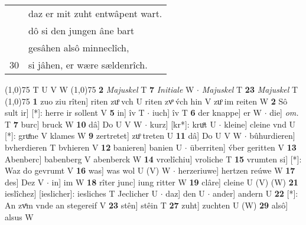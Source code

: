 \documentclass[8pt,a4paper,notitlepage]{article}
\begin{document}
\begin{table}[ht]
\begin{minipage}[t]{0.5\linewidth}
\begin{tabular}{rl}
 & daz er mit zuht entwâpent wart.\\ 
 & dô si den jungen âne bart\\ 
 & gesâhen alsô minneclîch,\\ 
30 & si jâhen, er wære sældenrîch.\\ 
\end{tabular}
\scriptsize
\line(1,0){75} \newline
T U V W \newline
\line(1,0){75} \newline
\textbf{2} \textit{Majuskel} T  \textbf{7} \textit{Initiale} W   $\cdot$ \textit{Majuskel} T  \textbf{23} \textit{Majuskel} T  \newline
\line(1,0){75} \newline
\textbf{1} zuo ziu rîten] riten zuͦ vch U riten zvͦ v́ch hin V zuͦ im reiten W \textbf{2} Sô sult ir] [*]: herre ir sollent V \textbf{5} in] îv T  $\cdot$ iuch] îv T \textbf{6} der knappe] er W  $\cdot$ die] \textit{om.} T \textbf{7} burc] bruck W \textbf{10} dâ] Do U V W  $\cdot$ kurz] [kr*]: kruͦt U  $\cdot$ kleine] cleine vnd U [*]: gruͤne V klames W \textbf{9} zertretet] zuͦ treten U \textbf{11} dâ] Do U V W  $\cdot$ bûhurdieren] bvherdieren T bvhieren V \textbf{12} banieren] banien U  $\cdot$ überriten] v́ber geritten V \textbf{13} Abenberc] babenberg V abenberck W \textbf{14} vrœlîchiu] vroliche T \textbf{15} vrumten si] [*]: Waz do gevrumt V \textbf{16} was] was wol U (V) W  $\cdot$ herzeriuwe] hertzen reúwe W \textbf{17} des] Dez V  $\cdot$ in] im W \textbf{18} rîter junc] iung ritter W \textbf{19} clâre] cleine U (V) (W) \textbf{21} ieslîchez] [ieslicher]: iesliches T Jeclicher U  $\cdot$ daz] den U  $\cdot$ ander] andern U \textbf{22} [*]: An zvͦm vnde an stegereif V \textbf{23} stên] stêin T \textbf{27} zuht] zuchten U (W) \textbf{29} alsô] alsus W \newline
\end{minipage}
\end{table}
\end{document}
